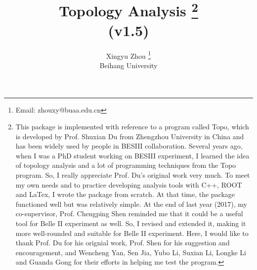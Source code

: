 \documentclass[landscape]{article}
\begin{document}
\title{Topology Analysis \footnote{\normalsize{This package is implemented with reference to a program called {\sc Topo}, which is developed by Prof. Shuxian Du from Zhengzhou University in China and has been widely used by people in BESIII collaboration. Several years ago, when I was a PhD student working on BESIII experiment, I learned the idea of topology analysis and a lot of programming techniques from the {\sc Topo} program. So, I really appreciate Prof. Du's original work very much. To meet my own needs and to practice developing analysis tools with C++, ROOT and LaTex, I wrote the package from scratch. At that time, the package functioned well but was relatively simple. At the end of last year (2017), my co-supervisor, Prof. Chengping Shen reminded me that it could be a useful tool for Belle II experiment as well. So, I revised and extended it, making it more well-rounded and suitable for Belle II experiment. Here, I would like to thank Prof. Du for his orignial work, Prof. Shen for his suggestion and encouragement, and Wencheng Yan, Sen Jia, Yubo Li, Suxian Li, Longke Li and Guanda Gong for their efforts in helping me test the program.}} \\ \vspace{0.1cm} \Large{(v1.5)}}
\author{Xingyu Zhou \footnote{\normalsize{Email: zhouxy@buaa.edu.cn}} \\ \vspace{0.1cm} Beihang University}
\maketitle

\clearpage


\listoftables


\clearpage
\end{document}
